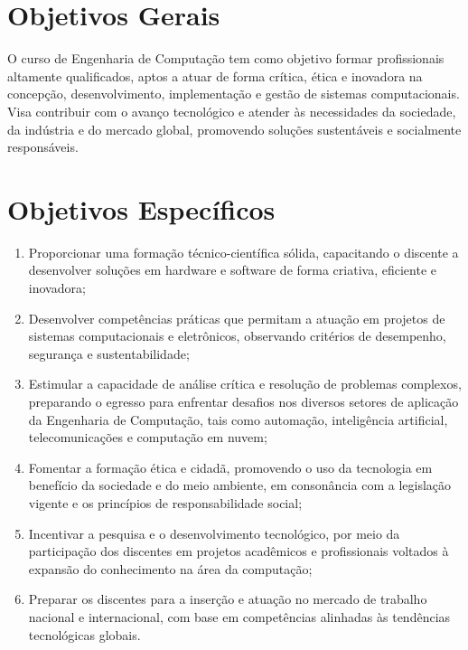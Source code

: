 \section{Objetivos Gerais}

O curso de Engenharia de Computação tem como objetivo formar profissionais altamente qualificados, aptos a atuar de forma crítica, ética e inovadora na concepção, desenvolvimento, implementação e gestão de sistemas computacionais. Visa contribuir com o avanço tecnológico e atender às necessidades da sociedade, da indústria e do mercado global, promovendo soluções sustentáveis e socialmente responsáveis.

\section{Objetivos Específicos}

\begin{enumerate}
    \item Proporcionar uma formação técnico-científica sólida, capacitando o discente a desenvolver soluções em hardware e software de forma criativa, eficiente e inovadora;

    \item Desenvolver competências práticas que permitam a atuação em projetos de sistemas computacionais e eletrônicos, observando critérios de desempenho, segurança e sustentabilidade;

    \item Estimular a capacidade de análise crítica e resolução de problemas complexos, preparando o egresso para enfrentar desafios nos diversos setores de aplicação da Engenharia de Computação, tais como automação, inteligência artificial, telecomunicações e computação em nuvem;

    \item Fomentar a formação ética e cidadã, promovendo o uso da tecnologia em benefício da sociedade e do meio ambiente, em consonância com a legislação vigente e os princípios de responsabilidade social;

    \item Incentivar a pesquisa e o desenvolvimento tecnológico, por meio da participação dos discentes em projetos acadêmicos e profissionais voltados à expansão do conhecimento na área da computação;

    \item Preparar os discentes para a inserção e atuação no mercado de trabalho nacional e internacional, com base em competências alinhadas às tendências tecnológicas globais.
\end{enumerate}

